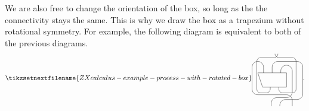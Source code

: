 \documentclass[fleqn]{NotesClass}
\begin{document}
    We are also free to change the orientation of the box, so long as the the connectivity stays the same.
    This is why we draw the box as a trapezium without rotational symmetry.
    For example, the following diagram is equivalent to both of the previous diagrams.
    \begin{equation}
        \tikzsetnextfilename{ZXcalculus-example-process-with-rotated-box}
        \begin{tikzpicture}[baseline=(current bounding box)]
            \draw (0, 0) -- ++ (-0.25, 0.75) -- ++ (1.5, 0) -- ++ (0, -0.75) -- cycle;
            \draw (0.05, 0.75) -- ++ (0, 0.3) arc (0:180:0.3) -- ++ (0, -1.15) arc (180:270:0.3) -- ++ (1.5, 0) arc (90:0:0.3) -- ++ (0, -0.3);
            \draw (0.5, 0.75) -- ++ (0, 0.3) arc (180:90:0.3) -- ++ (1, 0) arc (90:0:0.3) -- ++ (0, -1.4) arc (0:-90:0.3) -- ++ (-0.6, 0) arc (90:180:0.3) -- ++ (0, -0.05);
            \draw (0.95, 0.75) -- ++ (0, 0.1) arc (180:0:0.3) -- ++ (0, -1.1) arc (0:-90:0.3) -- ++ (-0.5, 0) arc (90:180:0.3) -- ++ (0, -0.15);
            \draw (0.4, 0) -- ++ (0, -0.1) arc (0:-90:0.2) -- ++ (-0.3, 0) arc (270:180:0.2) -- ++ (0, 1.45) arc (180:90:0.2) -- ++ (0.7, 0) arc (-90:0:0.2);
            \draw (0.85, 0) -- ++ (0, -0.1) arc (180:270:0.2) -- ++ (0.5, 0) arc (-90:0:0.2) -- ++ (0, 1.45) arc (0:90:0.2) -- ++ (-0.7, 0) arc (270:180:0.2);
        \end{tikzpicture}
        .
    \end{equation}
\end{document}
